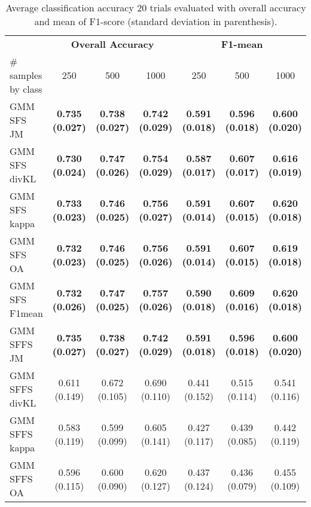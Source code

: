 \documentclass[journal,10pt,onecolumn]{IEEEtran}
\begin{document}
    \begin{table}[H]
        \centering
        \caption{Average classification accuracy 20 trials evaluated with overall accuracy and mean of F1-score (standard deviation in parenthesis).\label{tab:aisa-otbsimu-othereval}}
        \begin{tabular}{lcccccc}\toprule
             & \multicolumn{3}{c}{\bfseries Overall Accuracy} & \multicolumn{3}{c}{\bfseries F1-mean} \\ \cmidrule{2-7}
            \# samples by class & 250 & 500 & 1000  & 250 & 500 & 1000 \\ \midrule

            GMM SFS JM &      {\bfseries 0.735 (0.027)} & {\bfseries 0.738 (0.027)} & {\bfseries 0.742 (0.029)} & {\bfseries 0.591 (0.018)} & {\bfseries 0.596 (0.018)} & {\bfseries 0.600 (0.020)} \\
            GMM SFS divKL &   {\bfseries 0.730 (0.024)} & {\bfseries 0.747 (0.026)} & {\bfseries 0.754 (0.029)} & {\bfseries 0.587 (0.017)} & {\bfseries 0.607 (0.017)} & {\bfseries 0.616 (0.019)} \\
            GMM SFS kappa &   {\bfseries 0.733 (0.023)} & {\bfseries 0.746 (0.025)} & {\bfseries 0.756 (0.027)} & {\bfseries 0.591 (0.014)} & {\bfseries 0.607 (0.015)} & {\bfseries 0.620 (0.018)} \\
            GMM SFS OA &      {\bfseries 0.732 (0.023)} & {\bfseries 0.746 (0.025)} & {\bfseries 0.756 (0.026)} & {\bfseries 0.591 (0.014)} & {\bfseries 0.607 (0.015)} & {\bfseries 0.619 (0.018)} \\
            GMM SFS F1mean &  {\bfseries 0.732 (0.026)} & {\bfseries 0.747 (0.025)} & {\bfseries 0.757 (0.026)} & {\bfseries 0.590 (0.018)} & {\bfseries 0.609 (0.016)} & {\bfseries 0.620 (0.018)} \\
            GMM SFFS JM &     {\bfseries 0.735 (0.027)} & {\bfseries 0.738 (0.027)} & {\bfseries 0.742 (0.029)} & {\bfseries 0.591 (0.018)} & {\bfseries 0.596 (0.018)} & {\bfseries 0.600 (0.020)} \\
            GMM SFFS divKL &  0.611 (0.149) & 0.672 (0.105) & 0.690 (0.110) & 0.441 (0.152) & 0.515 (0.114) & 0.541 (0.116) \\
            GMM SFFS kappa &  0.583 (0.119) & 0.599 (0.099) & 0.605 (0.141) & 0.427 (0.117) & 0.439 (0.085) & 0.442 (0.119) \\
            GMM SFFS OA &     0.596 (0.115) & 0.600 (0.090) & 0.620 (0.127) & 0.437 (0.124) & 0.436 (0.079) & 0.455 (0.109) \\

\end{tabular}
\end{table}
\end{document}
